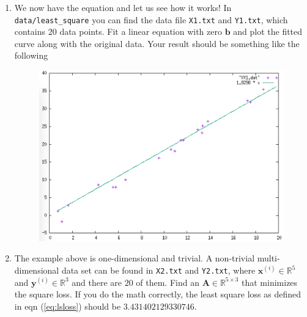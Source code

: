 \documentclass[a4paper,twoside, 10pt]{article}
\theoremstyle{wick}
\newcommand{\mat}[1]{\mathbf{#1}}
\newcommand{\ttt}{\texttt}
\begin{document}
\begin{enumerate}
		\item We now have the equation and let us see how it works! In \ttt{data/least\_square} you can find the data file \ttt{X1.txt} and \ttt{Y1.txt}, which contains $20$ data points. Fit a linear equation with zero $\bm{b}$ and plot the fitted curve along with the original data. Your result should be something like the following
		\begin{figure}[H]
			\centering
			\includegraphics[width=0.6\linewidth]{plot/least_square/XY1.png}
		\end{figure}

		\item The example above is one-dimensional and trivial. A non-trivial multi-dimensional data set can be found in \ttt{X2.txt} and \ttt{Y2.txt}, where $\bm{x}^{(i)} \in \mathbb{R}^{5}$ and $\bm{y}^{(i)} \in \mathbb{R}^3$ and there are $20$ of them. Find an $\mat{A} \in \mathbb{R}^{5 \times{} 3}$ that minimizes the square loss. If you do the math correctly, the least square loss as defined in eqn (\ref{eq:lsloss}) should be $3.431402129330746$.
	\end{enumerate}
\end{document}
